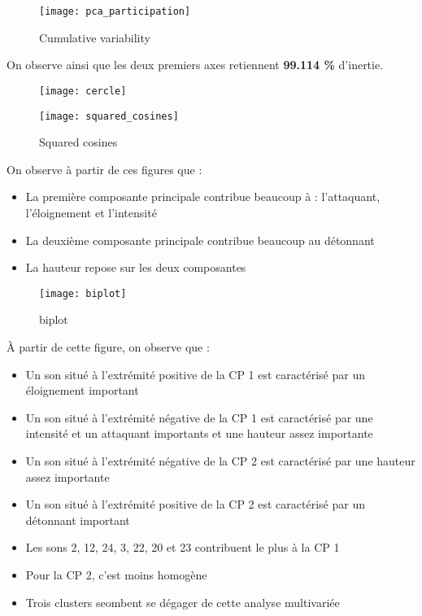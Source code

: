 \documentclass[12pt,a4paper,titlepage]{article}
\begin{document}
\begin{figure}[H]
    \caption{Cumulative variability}
    \texttt{[image: pca\_participation]}
    \centering
\end{figure}

On observe ainsi que les deux premiers axes retiennent \textbf{99.114 \%}
d'inertie.

\begin{figure}[H]
    \caption{}
    \texttt{[image: cercle]}
    \centering
\end{figure}

\begin{figure}[H]
    \caption{Squared cosines}
    \texttt{[image: squared\_cosines]}
    \centering
\end{figure}

On observe à partir de ces figures que :
\begin{itemize}
    \item{La première composante principale contribue beaucoup à : l'attaquant, l'éloignement et l'intensité}
    \item{La deuxième composante principale contribue beaucoup au détonnant}
    \item{La hauteur repose sur les deux composantes}
\end{itemize}

\begin{figure}[H]
    \caption{biplot}
    \texttt{[image: biplot]}
    \centering
\end{figure}

À partir de cette figure, on observe que :
\begin{itemize}
    \item{Un son situé à l'extrémité positive de la CP 1 est caractérisé par un éloignement important}
    \item{Un son situé à l'extrémité négative de la CP 1 est caractérisé par une intensité et un attaquant importants et une hauteur assez importante}
    \item{Un son situé à l'extrémité négative de la CP 2 est caractérisé par une hauteur assez importante}
    \item{Un son situé à l'extrémité positive de la CP 2 est caractérisé par un détonnant important}
    \item{Les sons 2, 12, 24, 3, 22, 20 et 23 contribuent le plus à la CP 1}
    \item{Pour la CP 2, c'est moins homogène}
    \item{Trois clusters seombent se dégager de cette analyse multivariée}
\end{itemize}
\end{document}
